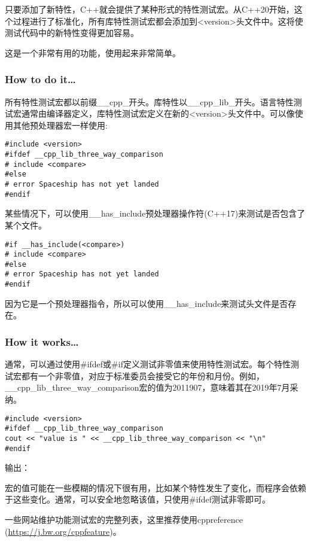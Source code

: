 
只要添加了新特性，C++就会提供了某种形式的特性测试宏。从C++20开始，这个过程进行了标准化，所有库特性测试宏都会添加到<version>头文件中。这将使测试代码中的新特性变得更加容易。

这是一个非常有用的功能，使用起来非常简单。

\subsubsection{How to do it…}

所有特性测试宏都以前缀\_\_cpp\_开头。库特性以\_\_cpp\_lib\_开头。语言特性测试宏通常由编译器定义，库特性测试宏定义在新的<version>头文件中。可以像使用其他预处理器宏一样使用:

\begin{lstlisting}[style=styleCXX]
#include <version>
#ifdef __cpp_lib_three_way_comparison
# include <compare>
#else
# error Spaceship has not yet landed
#endif
\end{lstlisting}

某些情况下，可以使用\_\_has\_include预处理器操作符(C++17)来测试是否包含了某个文件。

\begin{lstlisting}[style=styleCXX]
#if __has_include(<compare>)
# include <compare>
#else
# error Spaceship has not yet landed
#endif
\end{lstlisting}

因为它是一个预处理器指令，所以可以使用\_\_has\_include来测试头文件是否存在。

\subsubsection{How it works…}

通常，可以通过使用\#ifdef或\#if定义测试非零值来使用特性测试宏。每个特性测试宏都有一个非零值，对应于标准委员会接受它的年份和月份。例如，\_\_cpp\_lib\_three\_way\_comparison宏的值为2011907，意味着其在2019年7月采纳。

\begin{lstlisting}[style=styleCXX]
#include <version>
#ifdef __cpp_lib_three_way_comparison
cout << "value is " << __cpp_lib_three_way_comparison << "\n"
#endif
\end{lstlisting}

输出：


宏的值可能在一些模糊的情况下很有用，比如某个特性发生了变化，而程序会依赖于这些变化。通常，可以安全地忽略该值，只使用\#ifdef测试非零即可。

一些网站维护功能测试宏的完整列表，这里推荐使用cppreference (\url{https://j.bw.org/cppfeature})。








